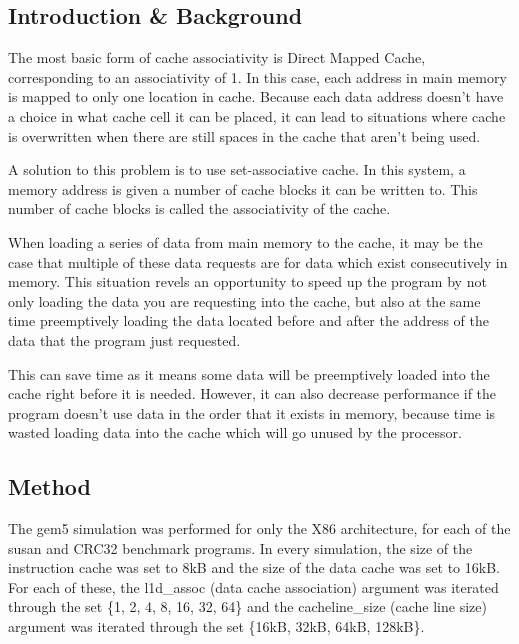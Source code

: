 
\subsection{Introduction \& Background}

The most basic form of cache associativity is Direct Mapped Cache, corresponding to an
associativity of 1.
In this case, each address in main memory is mapped to only one location in cache.
Because each data address doesn't have a choice in what cache cell it can be placed, 
it can lead to situations where cache is overwritten when there are still spaces in 
the cache that aren't being used.

A solution to this problem is to use set-associative cache. 
In this system, a memory address is given a number of cache blocks it can be written to.
This number of cache blocks is called the associativity of the cache.

When loading a series of data from main memory to the cache, it may be the case that 
multiple of these data requests are for data which exist consecutively in memory.
This situation revels an opportunity to speed up the program by not only loading 
the data you are requesting into the cache, but also at the same time preemptively loading 
the data located before and after the address of the data that the program just requested.

This can save time as it means some data will be preemptively loaded into the cache right 
before it is needed.
However, it can also decrease performance if the program doesn't use data in the order that 
it exists in memory, because time is wasted loading data into the cache which will go unused 
by the processor.

\subsection{Method}

The gem5 simulation was performed for only the X86 architecture, for each of the 
susan and CRC32 benchmark programs. 
In every simulation, the size of the instruction cache was set to 8kB and the size 
of the data cache was set to 16kB.
For each of these, the l1d\_assoc (data cache association) argument was iterated 
through the set \{1, 2, 4, 8, 16, 32, 64\} and the cacheline\_size (cache line size) argument 
was iterated through the set \{16kB, 32kB, 64kB, 128kB\}.

